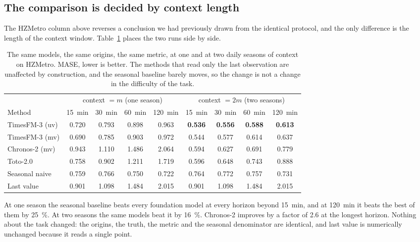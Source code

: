 \documentclass[11pt]{article}
\theoremstyle{plain}
\theoremstyle{definition}
\theoremstyle{remark}
\newcommand{\best}[1]{\textbf{#1}}
\begin{document}
\subsection{The comparison is decided by context length}
\label{sec:context}

The HZMetro column above reverses a conclusion we had previously drawn from the identical protocol, and the only difference is the length of the context window. Table~\ref{tab:context} places the two runs side by side.

\begin{table}[htbp]
\centering
\caption{The same models, the same origins, the same metric, at one and at two daily seasons of context on HZMetro. MASE, lower is better. The methods that read only the last observation are unaffected by construction, and the seasonal baseline barely moves, so the change is not a change in the difficulty of the task.}
\label{tab:context}
\small
\begin{tabular}{lcccc@{\hskip 2em}cccc}
\toprule
& \multicolumn{4}{c}{context $=m$ (one season)} & \multicolumn{4}{c}{context $=2m$ (two seasons)} \\
\cmidrule(lr){2-5}\cmidrule(lr){6-9}
Method & \SI{15}{\minute} & \SI{30}{\minute} & \SI{60}{\minute} & \SI{120}{\minute} & \SI{15}{\minute} & \SI{30}{\minute} & \SI{60}{\minute} & \SI{120}{\minute} \\
\midrule
TimesFM-3 (uv)     & 0.720 & 0.793 & 0.898 & 0.963 & \best{0.536} & \best{0.556} & \best{0.588} & \best{0.613} \\
TimesFM-3 (mv)     & 0.690 & 0.785 & 0.903 & 0.972 & 0.544 & 0.577 & 0.614 & 0.637 \\
Chronos-2 (mv)     & 0.943 & 1.110 & 1.486 & 2.064 & 0.594 & 0.627 & 0.691 & 0.779 \\
Toto-2.0           & 0.758 & 0.902 & 1.211 & 1.719 & 0.596 & 0.648 & 0.743 & 0.888 \\
\midrule
Seasonal naive     & 0.759 & 0.766 & 0.750 & 0.722 & 0.764 & 0.772 & 0.757 & 0.731 \\
Last value         & 0.901 & 1.098 & 1.484 & 2.015 & 0.901 & 1.098 & 1.484 & 2.015 \\
\bottomrule
\end{tabular}
\end{table}

At one season the seasonal baseline beats every foundation model at every horizon beyond \SI{15}{\minute}, and at \SI{120}{\minute} it beats the best of them by \SI{25}{\percent}. At two seasons the same models beat it by \SI{16}{\percent}. Chronos-2 improves by a factor of \num{2.6} at the longest horizon. Nothing about the task changed: the origins, the truth, the metric and the seasonal denominator are identical, and last value is numerically unchanged because it reads a single point.
\end{document}

